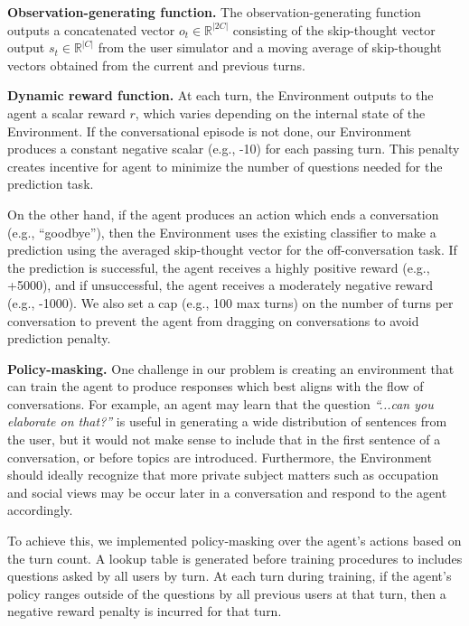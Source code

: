 \noindent \textbf{ Observation-generating function.} The observation-generating function outputs a 
concatenated vector $o_t \in \mathbb{R}^{|2C|}$ consisting of the skip-thought vector 
output $s_t \in \mathbb{R}^{|C|}$ from the user simulator and a moving average of skip-thought vectors obtained 
from the current and previous turns. 


\noindent \textbf{ Dynamic reward function. } At each turn, the Environment outputs to the agent a scalar reward $r$, 
which varies depending on the internal state of the Environment. 
If the conversational episode is not done, our Environment produces a constant negative scalar (e.g., -10) 
for each passing turn. This penalty creates incentive for agent to minimize the number of questions needed 
for the prediction task.


On the other hand, if the agent produces an action which ends a conversation (e.g., “goodbye”),
then the Environment uses the existing classifier to make a prediction using the averaged skip-thought vector 
for the off-conversation task. If the prediction is successful, the agent receives a highly positive reward (e.g., +5000), 
and if unsuccessful, the agent receives a moderately negative reward (e.g., -1000). 
We also set a cap (e.g., 100 max turns) on the number of turns per conversation to prevent 
the agent from dragging on conversations to avoid prediction penalty. 


\noindent \textbf{ Policy-masking. } One challenge in our problem is creating an environment that can 
train the agent to produce responses which best aligns with the flow of conversations. 
For example, an agent may learn that the question \textit{“...can you elaborate on that?”} is useful 
in generating a wide distribution of sentences from the user, but it would not make sense to include 
that in the first sentence of a conversation, or before topics are introduced. 
Furthermore, the Environment should ideally recognize that more private subject matters such as 
occupation and social views may be occur later in a conversation and respond to the agent accordingly.


To achieve this, we implemented policy-masking over the agent’s actions based on the turn count. 
A lookup table is generated before training procedures to includes questions asked by all users by turn. 
At each turn during training, if the agent’s policy ranges outside of the questions by all previous users at that turn, 
then a negative reward penalty is incurred for that turn.


